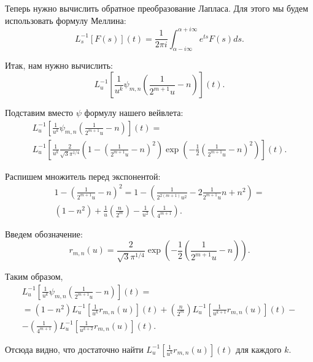 \documentclass[12pt, a4paper]{report}
\begin{document}
Теперь нужно вычислить обратное преобразование Лапласа. Для этого мы будем использовать формулу Меллина:
\[
    L^{-1}_s \left[ F \left( s \right)  \right](t) = 
    \frac{1}{2\pi i} \int_{\alpha - i \infty}^{\alpha + i \infty} e^{ts} F(s) ds.
\]

Итак, нам нужно вычислить:
\[
    L^{-1}_u \left[ \frac{1}{u^k} \psi_{m,n} \left( \frac{1}{2^{m+1} u} - n \right) \right] (t).
\]

Подставим вместо $\psi$ формулу нашего вейвлета:
\begin{multline*}
    L^{-1}_u \left[ \frac{1}{u^k} \psi_{m,n} \left( \frac{1}{2^{m+1} u} - n \right) \right] (t) =
\\%
    L^{-1}_u \left[ \frac{1}{u^k} \frac{2}{\sqrt{3} \pi^{1/4} } 
    \left( 1 - \left( \frac{1}{2^{m+1} u} - n \right)^2 \right) 
    \exp \left( -\frac{1}{2} \left( \frac{1}{2^{m+1}u} - n \right)^2  \right)
    \right](t).
\end{multline*}

Распишем множитель перед экспонентой:
\begin{multline*}
    1 - \left( \frac{1}{2^{m+1} u } - n \right)^2 =
    1 - \left( \frac{1}{2^{2(m+1)} u^2} - 2 \frac{1}{2^{m+1} u } n + n^2 \right) =
\\%
    \left( 1 - n^2 \right) + \frac{1}{u} \left(\frac{n}{2^m}\right) - \frac{1}{u^2} \left(\frac{1}{4^{m+1}}\right)
.\end{multline*}

Введем обозначение:
\[
    r_{m,n}(u) = \frac{2}{\sqrt{3} \pi^{1/4}} \exp \left( -\frac{1}{2} \left( \frac{1}{2^{m+1}u} - n \right)  \right) 
.\]

Таким образом,
\begin{multline}\label{eq:invlap_gen}
    L^{-1}_u \left[ \frac{1}{u^k} \psi_{m,n} \left( \frac{1}{2^{m+1} u} - n \right) \right] (t)
=\\=
    \left( 1 - n^2 \right)  L^{-1}_u \left[ \frac{1}{u^k} r_{m,n}(u) \right](t) +
    \left( \frac{n}{2^m} \right)  L^{-1}_u \left[ \frac{1}{u^{k+1}} r_{m,n}(u) \right](t)
-\\-
    \left( \frac{1}{4^{m+1}} \right)  L^{-1}_u \left[ \frac{1}{u^{k+2}} r_{m,n}(u) \right](t)
.\end{multline}

Отсюда видно, что достаточно найти $L^{-1}_u [\frac{1}{u^k} r_{m,n}(u)](t)$ для каждого $k$.
\end{document}
